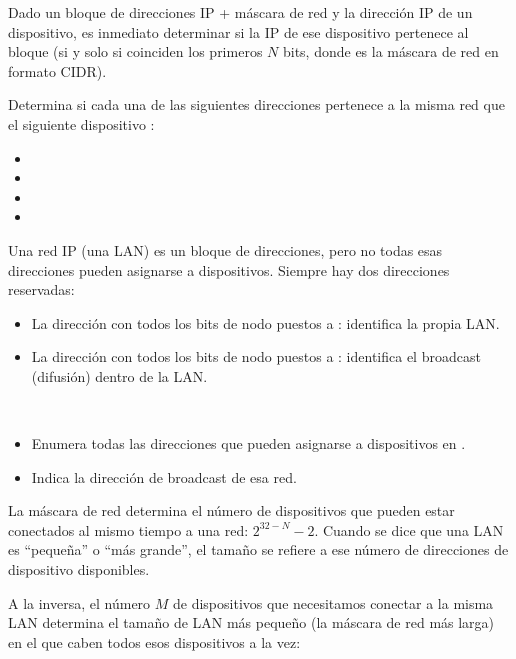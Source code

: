 Dado un bloque de direcciones IP + máscara de red y la dirección IP de un dispositivo, es inmediato determinar 
si la IP de ese dispositivo pertenece al bloque (si y solo si coinciden los primeros $N$ bits,
donde  es la máscara de red en formato CIDR).

\begin{exercise}
Determina si cada una de las siguientes direcciones pertenece a la misma red que
el siguiente dispositivo :
\begin{itemize}
\item {}
\item {}
\item {}
\item {}
\end{itemize}
\end{exercise}

Una red IP (una LAN) es un bloque de direcciones, pero no todas esas direcciones 
pueden asignarse a dispositivos. Siempre hay dos direcciones reservadas:
\begin{itemize}
\item La dirección con todos los bits de nodo puestos a : identifica la propia LAN.
\item La dirección con todos los bits de nodo puestos a : identifica el broadcast (difusión) dentro de la LAN.
\end{itemize}

\begin{exercise}\ \\[-0.5cm]
\begin{itemize}
\item Enumera todas las direcciones que pueden asignarse a dispositivos en .
\item Indica la dirección de broadcast de esa red.
\end{itemize}
\end{exercise}

La máscara de red  determina el número de dispositivos que pueden estar conectados al mismo tiempo
a una red: $2^{32-N} - 2$. Cuando se dice que una LAN es ``pequeña'' o ``más grande'', el tamaño se refiere a ese 
número de direcciones de dispositivo disponibles. 

A la inversa, el número $M$ de dispositivos que necesitamos conectar a la misma LAN determina el 
tamaño de LAN más pequeño (la máscara de red  más larga) en el que caben todos esos dispositivos a la vez:

